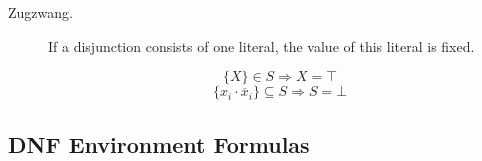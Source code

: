 \documentclass[12pt, letterpaper]{article}
\begin{document}
    \begin{description}
        \item[Zugzwang.]
        
        If a disjunction consists of one literal, the value of
        this literal is fixed.
        
        \[\{X\} \in S \Rightarrow X = \top \]
        \[\{x_i \cdot \overline x_i\} \subseteq S \Rightarrow S = \bot \]
    \end{description}

    \subsection*{DNF Environment Formulas}
    
	
\end{document}
